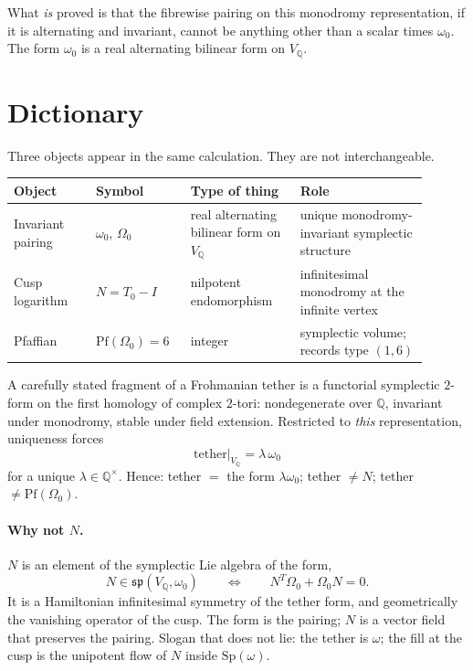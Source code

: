 \documentclass[11pt,a4paper]{article}
\theoremstyle{definition}
\theoremstyle{remark}
\newcommand{\Q}{\mathbb{Q}}
\newcommand{\Pf}{\mathrm{Pf}}
\newcommand{\spq}{\mathfrak{sp}}
\begin{document}
What \emph{is} proved is that the fibrewise pairing on this monodromy representation, if it is alternating and invariant, cannot be anything other than a scalar times $\omega_0$. The form $\omega_0$ is a real alternating bilinear form on $V_{\Q}$.

\section{Dictionary}

Three objects appear in the same calculation. They are not interchangeable.

\begin{center}
\small
\begin{tabular}{@{}
  >{\raggedright\arraybackslash}p{0.18\linewidth}
  >{\raggedright\arraybackslash}p{0.20\linewidth}
  >{\raggedright\arraybackslash}p{0.24\linewidth}
  >{\raggedright\arraybackslash}p{0.28\linewidth}@{}}
\hline
Object & Symbol & Type of thing & Role \\
\hline
Invariant pairing & $\omega_0$, $\Omega_0$ & real alternating bilinear form on $V_{\Q}$ & unique monodromy-invariant symplectic structure \\
Cusp logarithm & $N=T_0-I$ & nilpotent endomorphism & infinitesimal monodromy at the infinite vertex \\
Pfaffian & $\Pf(\Omega_0)=6$ & integer & symplectic volume; records type $(1,6)$ \\
\hline
\end{tabular}
\end{center}

A carefully stated fragment of a Frohmanian tether is a functorial symplectic $2$-form on the first homology of complex $2$-tori: nondegenerate over $\Q$, invariant under monodromy, stable under field extension. Restricted to \emph{this} representation, uniqueness forces
\[
\text{tether}\big|_{V_{\Q}}=\lambda\,\omega_0
\]
for a unique $\lambda\in\Q^\times$. Hence: tether $=$ the form $\lambda\omega_0$; tether $\neq N$; tether $\neq\Pf(\Omega_0)$.

\paragraph{Why not $N$.}
$N$ is an element of the symplectic Lie algebra of the form,
\[
N\in\spq(V_{\Q},\omega_0)\qquad\Longleftrightarrow\qquad N^T\Omega_0+\Omega_0 N=0.
\]
It is a Hamiltonian infinitesimal symmetry of the tether form, and geometrically the vanishing operator of the cusp. The form is the pairing; $N$ is a vector field that preserves the pairing. Slogan that does not lie: the tether is $\omega$; the fill at the cusp is the unipotent flow of $N$ inside $\mathrm{Sp}(\omega)$.
\end{document}
